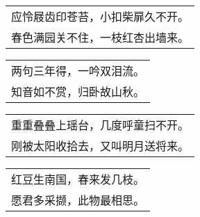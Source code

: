 \noindent\begin{minipage}{\linewidth}
  \vskip-3pt\begin{table}[H]
    \centering
    \begin{tabular}{@{}l@{}}
应怜屐齿印苍苔，小扣柴扉久不开。\\
春色满园关不住，一枝红杏出墙来。
    \end{tabular}
  \end{table}
\end{minipage}
\vspace{1cm}


\noindent\begin{minipage}{\linewidth}
  \vskip-3pt\begin{table}[H]
    \centering
    \begin{tabular}{@{}l@{}}
两句三年得，一吟双泪流。\\
知音如不赏，归卧故山秋。
    \end{tabular}
  \end{table}
\end{minipage}
\vspace{1cm}


\noindent\begin{minipage}{\linewidth}
  \vskip-3pt\begin{table}[H]
    \centering
    \begin{tabular}{@{}l@{}}
重重叠叠上瑶台，几度呼童扫不开。\\
刚被太阳收拾去，又叫明月送将来。
    \end{tabular}
  \end{table}
\end{minipage}
\vspace{1cm}


\noindent\begin{minipage}{\linewidth}
  \vskip-3pt\begin{table}[H]
    \centering
    \begin{tabular}{@{}l@{}}
红豆生南国，春来发几枝。\\
愿君多采撷，此物最相思。
    \end{tabular}
  \end{table}
\end{minipage}
\vspace{1cm}


